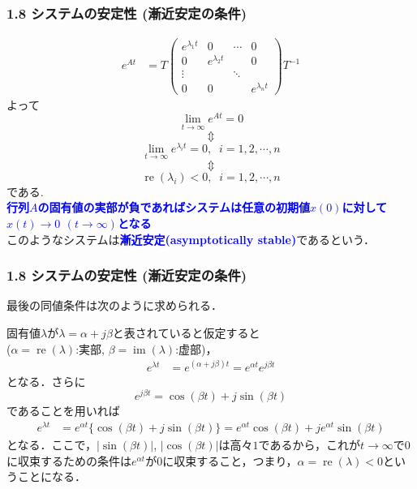\documentclass[10pt]{beamer}
\begin{document}
\begin{frame}[t]
\frametitle{1.8 システムの安定性 (漸近安定の条件)}
 

\addtocounter{equation}{-1}
\begin{align}
 e^{At}
 &= T
  \left(\begin{array}{cccc}
         e^{\lambda_1 t} & 0               & \cdots & 0 \\
   0               & e^{\lambda_2 t} &        & 0 \\
   \vdots          &                 & \ddots &   \\
   0               & 0               &        & e^{\lambda_n t}
  \end{array}\right)
  T^{-1}
\end{align}
よって
\begin{equation}
 \lim_{t \rightarrow \infty} e^{At} = 0
\end{equation}
\[\Updownarrow\]
\begin{equation}
 \lim_{t \rightarrow \infty} e^{\lambda_i t } = 0, \;\;
  i = 1, 2, \cdots, n
\end{equation}
\[\Updownarrow\]
\begin{equation}
 \operatorname{re}(\lambda_i) < 0, \;\; i = 1, 2, \cdots, n
\end{equation}
である.\\
\textcolor{blue}{\bf 行列$A$の固有値の実部が負であればシステムは任意の初期値$x(0)$に対して$x(t) \rightarrow 0$ $(t \rightarrow \infty)$となる}\\
このようなシステムは\textcolor{blue}{\bf 漸近安定(asymptotically stable)}であるという．
\end{frame}


\begin{frame}[t]
\frametitle{1.8 システムの安定性 (漸近安定の条件)}
最後の同値条件は次のように求められる．

固有値$\lambda$が$\lambda = \alpha + j \beta$と表されていると仮定すると\\
($\alpha = \operatorname{re}(\lambda)$:実部, $\beta = \operatorname{im}(\lambda)$:虚部)，
\begin{align*}
 e^{{\lambda} t} &= e^{(\alpha + j \beta)t} = e^{\alpha t}e^{j \beta t}
\end{align*}
となる．さらに
\begin{equation*}
 e^{j \beta t} = \cos(\beta t) + j \sin(\beta t)
\end{equation*}
であることを用いれば
\begin{align*}
 e^{{\lambda} t}  &= e^{\alpha t} \{ \cos(\beta t) + j \sin(\beta t) \} 
	= e^{\alpha t} \cos(\beta t)  + j e^{\alpha t} \sin(\beta t)
\end{align*}
となる．ここで，$|\sin(\beta t)|$, $|\cos(\beta t)|$は高々$1$であるから，これが$t \rightarrow \infty$で$0$に収束するための条件は$e^{{\alpha} t}$が$0$に収束すること，つまり，$\alpha = \operatorname{re}(\lambda)<0$ということになる．
\end{frame}
\end{document}
